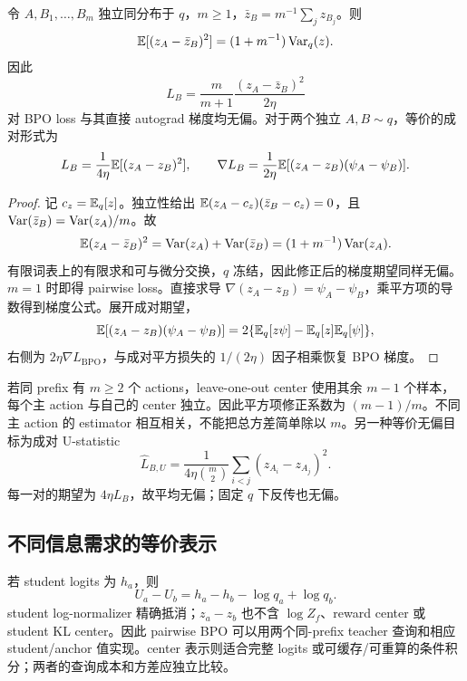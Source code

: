 \begin{theorem}
\label{est:bpo-sampling}
令 $A,B_1,\ldots,B_m$ 独立同分布于 $q$，$m\geq1$，$\bar z_B=m^{-1}\sum_jz_{B_j}$。则
\begin{equation}
\mathbb E[(z_A-\bar z_B)^2]=(1+m^{-1})\operatorname{Var}_q(z).
\end{equation}
因此
\begin{equation}
\widehat L_B=\frac{m}{m+1}\frac{(z_A-\bar z_B)^2}{2\eta}
\end{equation}
对 BPO loss 与其直接 autograd 梯度均无偏。对于两个独立 $A,B\sim q$，等价的成对形式为
\begin{equation}
L_B=\frac1{4\eta}\mathbb E[(z_A-z_B)^2],\qquad
\nabla L_B=\frac1{2\eta}\mathbb E[(z_A-z_B)(\psi_A-\psi_B)].
\end{equation}
\end{theorem}
\begin{proof}
记 $c_z=\mathbb E_q[z]$。独立性给出 $\mathbb E(z_A-c_z)(\bar z_B-c_z)=0$，且 $\operatorname{Var}(\bar z_B)=\operatorname{Var}(z_A)/m$。故
\begin{equation}
\mathbb E(z_A-\bar z_B)^2=\operatorname{Var}(z_A)+\operatorname{Var}(\bar z_B)=(1+m^{-1})\operatorname{Var}(z_A).
\end{equation}
有限词表上的有限求和可与微分交换，$q$ 冻结，因此修正后的梯度期望同样无偏。$m=1$ 时即得 pairwise loss。直接求导 $\nabla(z_A-z_B)=\psi_A-\psi_B$，乘平方项的导数得到梯度公式。展开成对期望，
\begin{equation}
\mathbb E[(z_A-z_B)(\psi_A-\psi_B)]
=2\{\mathbb E_q[z\psi]-\mathbb E_q[z]\mathbb E_q[\psi]\},
\end{equation}
右侧为 $2\eta\nabla L_{\mathrm{BPO}}$，与成对平方损失的 $1/(2\eta)$ 因子相乘恢复 BPO 梯度。
\end{proof}

若同 prefix 有 $m\geq2$ 个 actions，leave-one-out center 使用其余 $m-1$ 个样本，每个主 action 与自己的 center 独立。因此平方项修正系数为 $(m-1)/m$。不同主 action 的 estimator 相互相关，不能把总方差简单除以 $m$。另一种等价无偏目标为成对 U-statistic
\begin{equation}
\widehat L_{B,U}=\frac1{4\eta\binom m2}\sum_{i<j}(z_{A_i}-z_{A_j})^2.
\end{equation}
每一对的期望为 $4\eta L_B$，故平均无偏；固定 $q$ 下反传也无偏。

\subsection{不同信息需求的等价表示}
\label{est:bpo-access}
若 student logits 为 $h_a$，则
\begin{equation}
U_a-U_b=h_a-h_b-\log q_a+\log q_b.
\end{equation}
student log-normalizer 精确抵消；$z_a-z_b$ 也不含 $\log Z_f$、reward center 或 student KL center。因此 pairwise BPO 可以用两个同-prefix teacher 查询和相应 student/anchor 值实现。center 表示则适合完整 logits 或可缓存/可重算的条件积分；两者的查询成本和方差应独立比较。

